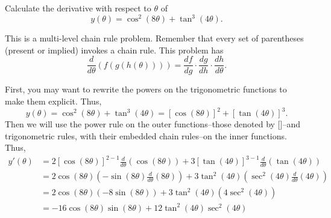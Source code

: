 \documentclass{ximera}
\author{Emma Smith Zbarsky}
\begin{document}
\begin{exercise}

Calculate the derivative with respect to $\theta$ of
\[y(\theta) = \cos^2(8\theta) + \tan^3(4\theta).\]


\begin{hint}
This is a multi-level chain rule problem. Remember that every set of
parentheses (present or implied) invokes a chain rule. This problem has
\[\frac{d}{d\theta}\left(f(g(h(\theta)))\right) = \frac{df}{dg}\cdot \frac{dg}{dh}\cdot \frac{dh}{d\theta}.\]
\end{hint}


\begin{hint}
First, you may want to rewrite the powers on the trigonometric functions
to make them explicit. Thus, \[
y(\theta) = \cos^2(8\theta)+\tan^3(4\theta) = \left[\cos(8\theta)\right]^2 + \left[\tan(4\theta)\right]^3.
\] Then we will use the power rule on the outer functions--those denoted
by {[}{]}--and trigonometric rules, with their embedded chain rules--on
the inner functions. Thus, \begin{align*}
y'(\theta) &= 2\left[\cos(8\theta)\right]^{2-1}\frac{d}{d\theta}\left(\cos(8\theta)\right)+3\left[\tan(4\theta)\right]^{3-1}\frac{d}{d\theta}\left(\tan(4\theta)\right) \\
&= 2\cos(8\theta)\left(-\sin(8\theta)\frac{d}{d\theta}\left(8\theta\right)\right) + 3\tan^2(4\theta)\left(\sec^2(4\theta)\frac{d}{d\theta}\left(4\theta\right)\right) \\
&= 2\cos(8\theta)\left(-8\sin(8\theta)\right) + 3\tan^2(4\theta)\left(4\sec^2(4\theta)\right) \\
&= \boxed{-16\cos(8\theta)\sin(8\theta) + 12\tan^2(4\theta)\sec^2(4\theta)}
\end{align*}
\end{hint}


\begin{multipleChoice}
\end{multipleChoice}

\end{exercise}
\end{document}
